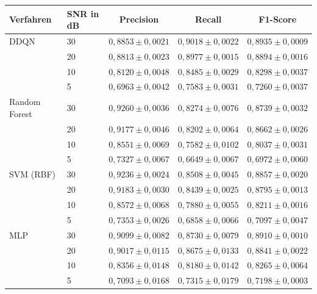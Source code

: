 \begin{tabular}{llccc}
\toprule
\textbf{Verfahren} & \textbf{SNR in dB} & \textbf{Precision} & \textbf{Recall} & \textbf{F1-Score} \\
\midrule
DDQN & 30 & $0{,}8853 \pm 0{,}0021$ & $0{,}9018 \pm 0{,}0022$ & $0{,}8935 \pm 0{,}0009$ \\
 & 20 & $0{,}8813 \pm 0{,}0023$ & $0{,}8977 \pm 0{,}0015$ & $0{,}8894 \pm 0{,}0016$ \\
 & 10 & $0{,}8120 \pm 0{,}0048$ & $0{,}8485 \pm 0{,}0029$ & $0{,}8298 \pm 0{,}0037$ \\
 & 5 & $0{,}6963 \pm 0{,}0042$ & $0{,}7583 \pm 0{,}0031$ & $0{,}7260 \pm 0{,}0037$ \\
\midrule
Random Forest & 30 & $0{,}9260 \pm 0{,}0036$ & $0{,}8274 \pm 0{,}0076$ & $0{,}8739 \pm 0{,}0032$ \\
 & 20 & $0{,}9177 \pm 0{,}0046$ & $0{,}8202 \pm 0{,}0064$ & $0{,}8662 \pm 0{,}0026$ \\
 & 10 & $0{,}8551 \pm 0{,}0069$ & $0{,}7582 \pm 0{,}0102$ & $0{,}8037 \pm 0{,}0031$ \\
 & 5 & $0{,}7327 \pm 0{,}0067$ & $0{,}6649 \pm 0{,}0067$ & $0{,}6972 \pm 0{,}0060$ \\
\midrule
SVM (RBF) & 30 & $0{,}9236 \pm 0{,}0024$ & $0{,}8508 \pm 0{,}0045$ & $0{,}8857 \pm 0{,}0020$ \\
 & 20 & $0{,}9183 \pm 0{,}0030$ & $0{,}8439 \pm 0{,}0025$ & $0{,}8795 \pm 0{,}0013$ \\
 & 10 & $0{,}8572 \pm 0{,}0068$ & $0{,}7880 \pm 0{,}0055$ & $0{,}8211 \pm 0{,}0016$ \\
 & 5 & $0{,}7353 \pm 0{,}0026$ & $0{,}6858 \pm 0{,}0066$ & $0{,}7097 \pm 0{,}0047$ \\
\midrule
MLP & 30 & $0{,}9099 \pm 0{,}0082$ & $0{,}8730 \pm 0{,}0079$ & $0{,}8910 \pm 0{,}0010$ \\
 & 20 & $0{,}9017 \pm 0{,}0115$ & $0{,}8675 \pm 0{,}0133$ & $0{,}8841 \pm 0{,}0022$ \\
 & 10 & $0{,}8356 \pm 0{,}0148$ & $0{,}8180 \pm 0{,}0142$ & $0{,}8265 \pm 0{,}0064$ \\
 & 5 & $0{,}7093 \pm 0{,}0168$ & $0{,}7315 \pm 0{,}0179$ & $0{,}7198 \pm 0{,}0003$ \\
\bottomrule
\end{tabular}
